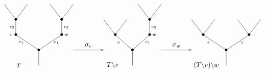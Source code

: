 \documentclass[11pt,a4paper,openright,oneside]{article}
\numberwithin{equation}{section}
\theoremstyle{definition}
\begin{document}
\begin{equation}
    \xy
    <0.08cm, 0cm>:
    (0.0, 0.0)*{}="1"; %
    (0.0, 10.0)*=0{\bullet}="2"; %
    (-15.0, 20.0)*=0{\bullet}="3"; %
    (-15.0, 30.0)*=0{\bullet}="4"; %
    (-22.5, 40.0)*{}="5"; %
    (-7.5, 40.0)*{}="6"; %
    (15.0, 20.0)*=0{\bullet}="7"; %
    (15.0, 30.0)*=0{\bullet}="8"; %
    (7.5, 40.0)*{}="9"; %
    (22.5, 40.0)*{}="10"; %
    "1";"2" **\dir{-};
    "2";"3" **\dir{-};
    "3";"4" **\dir{-};
    "4";"5" **\dir{-};
    "4";"6" **\dir{-};
    "2";"7" **\dir{-};
    "7";"8" **\dir{-};
    "8";"9" **\dir{-};
    "8";"10" **\dir{-};
    (-18.0, 20.0)*=0{\scriptstyle v};
    (18.0, 20.0)*=0{\scriptstyle w};
    (-11.5, 15.0)*=0{\scriptstyle e_1};
    (-17.5, 25.0)*=0{\scriptstyle e_2};
    (11.5, 15.0)*=0{\scriptstyle c_1};
    (18, 25.0)*=0{\scriptstyle c_2};
    (-13,0)*{T};
    \endxy
    \xy
    <0.08cm, 0cm>:
    (-10, 0.0)*{}="1";
    (10, 0.0)*{}="2";
    (10, 10)*{}="3";
    (-10, 0)*{}="4";
    {\ar(-10, 10)*{};(10,10)*{}};
    (0,13)*{\sigma_v};
    \endxy
    \xy
    <0.08cm, 0cm>:
    (0.0, 0.0)*{}="1"; %
    (0.0, 10.0)*=0{\bullet}="2"; %
    (-11.25, 20.0)*=0{\bullet}="3"; %
    (-18.75, 30.0)*{}="4"; %
    (-3.75, 30.0)*{}="5"; %
    (11.25, 20.0)*=0{\bullet}="6"; %
    (11.25, 30.0)*=0{\bullet}="7"; %
    (3.75, 40.0)*{}="8"; %
    (18.75, 40.0)*{}="9"; %
    "1";"2" **\dir{-};
    "2";"3" **\dir{-};
    "3";"4" **\dir{-};
    "3";"5" **\dir{-};
    "2";"6" **\dir{-};
    "6";"7" **\dir{-};
    "7";"8" **\dir{-};
    "7";"9" **\dir{-};
    (14.25, 20.0)*=0{\scriptstyle w};
    (-9, 15.0)*=0{\scriptstyle e};
    (10, 15.0)*=0{\scriptstyle c_1};
    (14, 25.0)*=0{\scriptstyle c_2};
    (-13,0)*{T\backslash v};
    \endxy
    \xy
    <0.08cm, 0cm>:
    (-10, 0.0)*{}="1";
    (10, 0.0)*{}="2";
    (10, 10)*{}="3";
    (-10, 0)*{}="4";
    {\ar(-10, 10)*{};(10,10)*{}};
    (0,13)*{\sigma_w};
    \endxy
    \xy
    <0.08cm, 0cm>:
    (0.0, 0.0)*{}="1"; %
    (0.0, 10.0)*=0{\bullet}="2"; %
    (-15.0, 20.0)*=0{\bullet}="3"; %
    (-22.5, 30.0)*{}="4"; %
    (-7.5, 30.0)*{}="5"; %
    (15.0, 20.0)*=0{\bullet}="6"; %
    (7.5, 30.0)*{}="7"; %
    (22.5, 30.0)*{}="8"; %
    "1";"2" **\dir{-};
    "2";"3" **\dir{-};
    "3";"4" **\dir{-};
    "3";"5" **\dir{-};
    "2";"6" **\dir{-};
    "6";"7" **\dir{-};
    "6";"8" **\dir{-};
    (-11.5, 15.0)*=0{\scriptstyle e};
    (10.5, 15.0)*=0{\scriptstyle c};
    (-13,0)*{(T\backslash v)\backslash w};
    \endxy
\end{equation}
\end{document}
